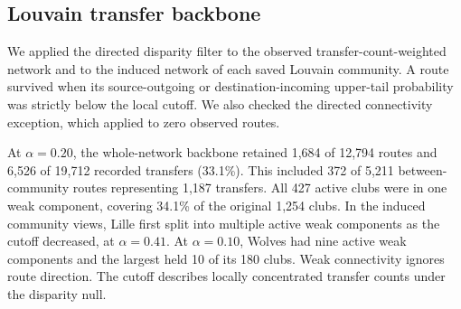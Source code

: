 \subsection{Louvain transfer backbone}
\label{sec:louvain-transfer-backbone}

We applied the directed disparity filter \cite{serrano2009multiscale} to the
observed transfer-count-weighted network and to the induced network of each
saved Louvain community. A route survived when its source-outgoing or
destination-incoming upper-tail probability was strictly below the local
cutoff. We also checked the directed connectivity exception, which applied to
zero observed routes.

At $\alpha=0.20$, the whole-network backbone retained 1,684 of 12,794 routes
and 6,526 of 19,712 recorded transfers (33.1\%). This included 372 of 5,211
between-community routes representing 1,187 transfers. All 427 active clubs
were in one weak component, covering 34.1\% of the original 1,254 clubs. In the
induced community views, Lille first split into multiple active weak components
as the cutoff decreased, at $\alpha=0.41$. At $\alpha=0.10$, Wolves had nine
active weak components and the largest held 10 of its 180 clubs. Weak
connectivity ignores route direction. The cutoff describes locally
concentrated transfer counts under the disparity null.
